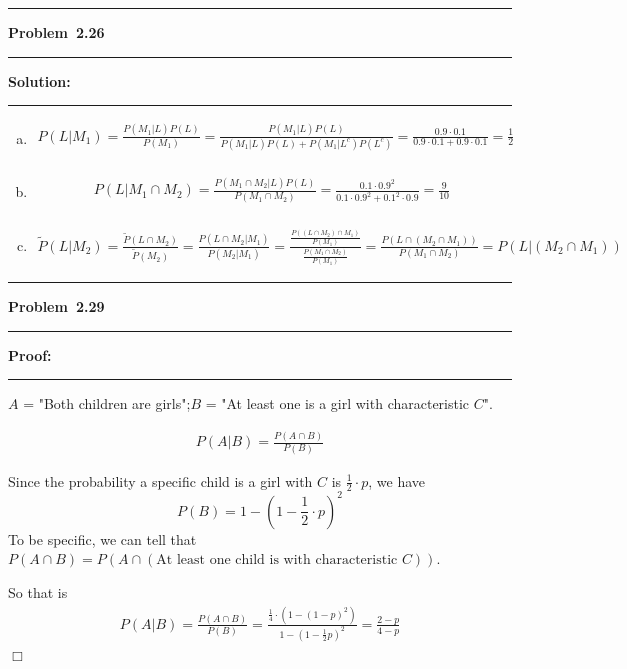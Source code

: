 \documentclass[10.5pt]{article}
\newcommand\question[1]{\vspace{.2in}\hrule\vspace{0.04in}\textbf{Problem\ #1}\vspace{.4em}\hrule\vspace{.10in}}
\newcommand\Solution{\vspace{.3in}\textbf{Solution:}\vspace{.5em}\hrule\vspace{.08in}\par}
\newcommand\Proof{\vspace{.3in}\textbf{Proof:}\vspace{.5em}\hrule\vspace{.08in}\par}
\begin{document}
\pagebreak

\question{2.26}
	\Solution{}
	\begin{enumerate}[(a)]
		\item \begin{align*}
			P(L|M_1) = \frac{P(M_1|L)P(L)}{P(M_1)} = \frac{P(M_1|L)P(L)}{P(M_1|L)P(L)+P(M_1|L^c)P(L^c)} = \frac{0.9\cdot0.1}{0.9\cdot0.1+0.9\cdot0.1} = \frac{1}{2}\\
		\end{align*}

		\vspace{2cm}


		\item \begin{align*}
			P(L|M_1\cap M_2) =\frac{P(M_1\cap M_2|L)P(L)}{P(M_1\cap M_2)}=\frac{0.1\cdot0.9^2}{0.1\cdot0.9^2+0.1^2\cdot0.9}= \frac{9}{10}\\
		\end{align*}

		\vspace{2cm}


		\item \begin{align*}
			\tilde{P}(L|M_2) = \frac{\tilde{P}(L\cap M_2)}{\tilde{P}(M_2)}
			= \frac{P(L\cap M_2|M_1)}{P(M_2|M_1)}
			= \frac{\frac{P((L\cap M_2)\cap M_1)}{P(M_1)}}{\frac{P(M_1\cap M_2)}{P(M_1)}}
			= \frac{P(L\cap (M_2\cap M_1))}{P(M_1\cap M_2)}
			= P(L|(M_2\cap M_1))
		\end{align*}
	\end{enumerate}
		
\pagebreak

\question{2.29}
\Proof{}
$A$ = "Both children are girls";\quad $B$ = "At least one is a girl with characteristic $C$".

\begin{align*}
	P(A|B) = \frac{P(A\cap B)}{P(B)}
\end{align*}

Since the probability a specific child is a girl with $C$ is $\frac{1}{2}\cdot p$, we have 
$$P(B) = 1 - (1 - \frac{1}{2}\cdot p)^2$$
To be specific, we can tell that $P(A\cap B) = P(A\cap(\text{At least one child is with characteristic $C$}))$.

So that is 
\begin{align*}
	P(A|B) = \frac{P(A\cap B)}{P(B)} 
	= \frac{\frac{1}{4}\cdot(1-(1-p)^2)}{1-(1-\frac{1}{2}p)^2} =\frac{2-p}{4-p}
\end{align*}
$\Box$

\pagebreak
\end{document}
